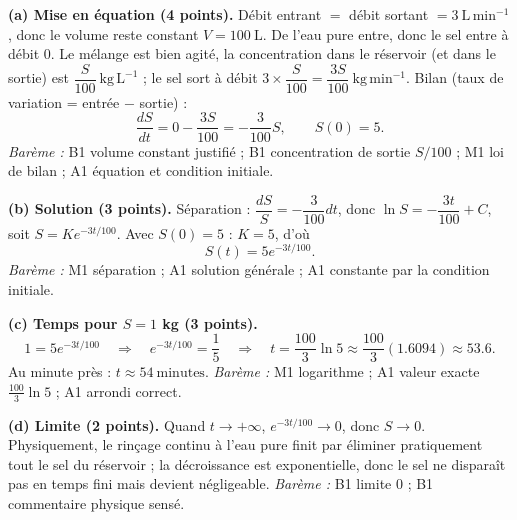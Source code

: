 \documentclass[11pt]{article}
\begin{document}
\begin{corrige}
\textbf{(a) Mise en équation (4 points).} Débit entrant $=$ débit sortant $= 3\ \mathrm{L\,min^{-1}}$, donc le volume reste constant $V = 100\ \mathrm{L}$. De l'eau pure entre, donc le sel entre à débit $0$. Le mélange est bien agité, la concentration dans le réservoir (et dans le sortie) est $\dfrac{S}{100}\ \mathrm{kg\,L^{-1}}$ ; le sel sort à débit $3 \times \dfrac{S}{100} = \dfrac{3S}{100}\ \mathrm{kg\,min^{-1}}$. Bilan (taux de variation = entrée $-$ sortie) :
\[ \frac{dS}{dt} = 0 - \frac{3S}{100} = -\frac{3}{100}S, \qquad S(0) = 5. \]
\emph{Barème :} B1 volume constant justifié ; B1 concentration de sortie $S/100$ ; M1 loi de bilan ; A1 équation et condition initiale.

\textbf{(b) Solution (3 points).} Séparation : $\dfrac{dS}{S} = -\dfrac{3}{100}dt$, donc $\ln S = -\dfrac{3t}{100} + C$, soit $S = Ke^{-3t/100}$. Avec $S(0) = 5$ : $K = 5$, d'où
\[ \boxed{S(t) = 5e^{-3t/100}}. \]
\emph{Barème :} M1 séparation ; A1 solution générale ; A1 constante par la condition initiale.

\textbf{(c) Temps pour $S = 1$ kg (3 points).}
\[ 1 = 5e^{-3t/100} \quad\Longrightarrow\quad e^{-3t/100} = \frac{1}{5} \quad\Longrightarrow\quad t = \frac{100}{3}\ln 5 \approx \frac{100}{3}(1.6094) \approx 53.6. \]
Au minute près : $\boxed{t \approx 54\ \text{minutes}}$. \emph{Barème :} M1 logarithme ; A1 valeur exacte $\frac{100}{3}\ln 5$ ; A1 arrondi correct.

\textbf{(d) Limite (2 points).} Quand $t \to +\infty$, $e^{-3t/100} \to 0$, donc $S \to 0$. Physiquement, le rinçage continu à l'eau pure finit par éliminer pratiquement tout le sel du réservoir ; la décroissance est exponentielle, donc le sel ne disparaît pas en temps fini mais devient négligeable. \emph{Barème :} B1 limite $0$ ; B1 commentaire physique sensé.
\end{corrige}
\end{document}
